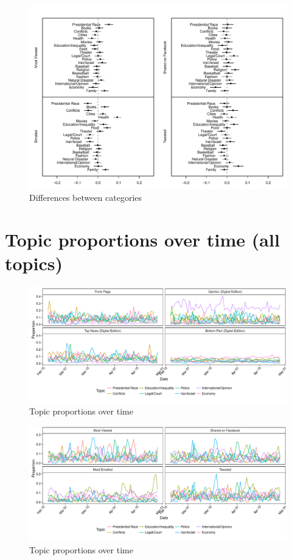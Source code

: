 \documentclass[12pt]{article}
\begin{document}
\begin{figure}[h]
\caption{Differences between categories}\label{fig:res_share}
\includegraphics[width=\textwidth]{../calc/fig/res_share}
\end{figure}


\clearpage
\section{Topic proportions over time (all topics)}\label{app:series}
\renewcommand\thefigure{\thesection.\arabic{figure}}
\renewcommand\thetable{\thesection.\arabic{table}}
\setcounter{figure}{0}
\setcounter{table}{0}

\begin{figure}[h]
\caption{Topic proportions over time}\label{fig:series_nyt}
\includegraphics[width=\textwidth]{../calc/fig/series_nyt}
\end{figure}

\begin{figure}[h]
\caption{Topic proportions over time}\label{fig:series_share}
\includegraphics[width=\textwidth]{../calc/fig/series_share}
\end{figure}
\end{document}
